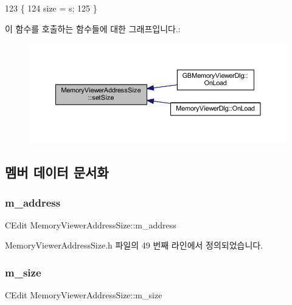 \begin{DoxyCode}
123 \{
124   size = s;
125 \}
\end{DoxyCode}
이 함수를 호출하는 함수들에 대한 그래프입니다.\+:
\nopagebreak
\begin{figure}[H]
\begin{center}
\leavevmode
\includegraphics[width=350pt]{class_memory_viewer_address_size_a20e77ae46d654fc217b381d6d8aac00d_icgraph}
\end{center}
\end{figure}


\subsection{멤버 데이터 문서화}
\mbox{\label{class_memory_viewer_address_size_a91998e945a9ebfc2dd2636f75e89d974}} 
\subsubsection{\texorpdfstring{m\+\_\+address}{m\_address}}
{\footnotesize\ttfamily C\+Edit Memory\+Viewer\+Address\+Size\+::m\+\_\+address}



Memory\+Viewer\+Address\+Size.\+h 파일의 49 번째 라인에서 정의되었습니다.

\mbox{\label{class_memory_viewer_address_size_a02bf9c56d2fe4c0edb66f6f26323378e}} 
\subsubsection{\texorpdfstring{m\+\_\+size}{m\_size}}
{\footnotesize\ttfamily C\+Edit Memory\+Viewer\+Address\+Size\+::m\+\_\+size}



